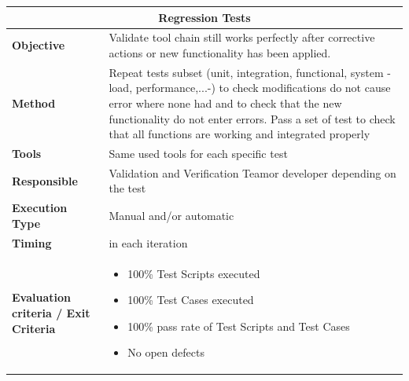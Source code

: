 \begin{center}
\begin{longtable}[H]{|p{4cm}|p{9cm}|}\hline
\multicolumn{2}{|c|}{\textbf{Regression Tests}}\\\hline
\textbf{Objective} &  Validate tool chain still works perfectly after corrective actions or new functionality has been applied.\\\hline
\textbf{Method} & Repeat tests subset (unit, integration, functional, system -load, performance,...-) to check modifications do not cause error where none had and to check that the new functionality do not enter errors. Pass a set of test to check that all functions are working and integrated properly \\\hline
\textbf{Tools} & Same used tools for each specific test\\\hline
\textbf{Responsible} & Validation and Verification Teamor developer depending on the test\\\hline
\textbf{Execution Type} & Manual and/or automatic\\\hline
\textbf{Timing} & in each iteration \\\hline
\textbf{Evaluation criteria / Exit Criteria} & \begin{itemize}
\item 100\% Test Scripts executed
\item 100\% Test Cases executed
\item 100\% pass rate of Test Scripts and Test Cases
\item No open defects
\end{itemize} \\\hline
\end{longtable}
\end{center}

